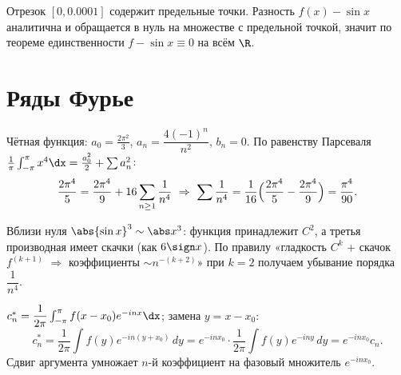\sol Отрезок $[0,0.0001]$ содержит предельные точки. Разность $f(x)-\sin x$ аналитична и обращается
в нуль на множестве с предельной точкой, значит по теореме единственности $f-\sin x\equiv0$ на всём
$\R$.

\section{Ряды Фурье}

\sol Чётная функция: $a_0=\tfrac{2\pi^2}{3}$, $a_n=\dfrac{4(-1)^n}{n^2}$, $b_n=0$. По равенству
Парсеваля $\tfrac1\pi\int_{-\pi}^\pi x^4\dx=\tfrac{a_0^2}{2}+\sum a_n^2$:
\[
  \frac{2\pi^4}{5}=\frac{2\pi^4}{9}+16\sum_{n\ge1}\frac1{n^4}
  \ \Rightarrow\ \sum\frac1{n^4}=\frac1{16}\Bigl(\frac{2\pi^4}{5}-\frac{2\pi^4}{9}\Bigr)=\frac{\pi^4}{90}.
\]

\sol Вблизи нуля $\abs{\sin x}^3\sim\abs x^3$: функция принадлежит $C^2$, а третья производная имеет
скачки (как $6\sign x$). По правилу «гладкость $C^k$ + скачок $f^{(k+1)}$ $\Rightarrow$ коэффициенты
$\sim n^{-(k+2)}$» при $k=2$ получаем убывание порядка $\dfrac1{n^4}$.

\sol $c_n^{*}=\dfrac1{2\pi}\int_{-\pi}^\pi f(x-x_0)e^{-inx}\dx$; замена $y=x-x_0$:
\[
  c_n^{*}=\frac1{2\pi}\int f(y)e^{-in(y+x_0)}\,dy=e^{-inx_0}\cdot\frac1{2\pi}\int f(y)e^{-iny}\,dy
  =e^{-inx_0}c_n.
\]
Сдвиг аргумента умножает $n$-й коэффициент на фазовый множитель $e^{-inx_0}$.
